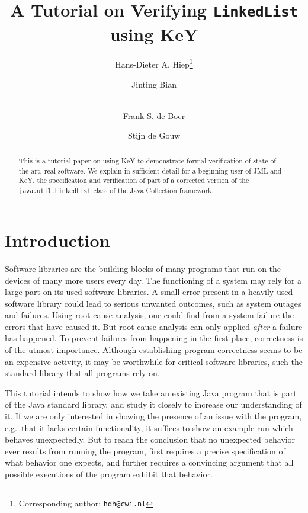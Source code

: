 \documentclass[runningheads]{llncs}
\begin{document}
\renewcommand{\thelstlisting}{\arabic{lstlisting}}

\title{A Tutorial on Verifying \texttt{LinkedList} using KeY}
\author{{Hans-Dieter} A. Hiep\footnote{Corresponding author: \texttt{hdh@cwi.nl}} \and Jinting Bian \and\\
Frank S. de Boer \and Stijn de Gouw}


\maketitle

\begin{abstract}
This is a tutorial paper on using KeY to demonstrate formal verification of state-of-the-art, real software. We explain in sufficient detail for a beginning user of JML and KeY, the specification and verification of part of a corrected version of the \texttt{java.util.LinkedList} class of the Java Collection framework.
\end{abstract}


\section{Introduction}

Software libraries are the building blocks of many programs that run on the devices of many more users every day. The functioning of a system may rely for a large part on its used software libraries. A small error present in a heavily-used software library could lead to serious unwanted outcomes, such as system outages and failures. Using root cause analysis, one could find from a system failure the errors that have caused it. But root cause analysis can only applied \emph{after} a failure has happened. To prevent failures from happening in the first place, correctness is of the utmost importance. Although establishing program correctness seems to be an expensive activity, it may be worthwhile for critical software libraries, such the standard library that all programs rely on.

This tutorial intends to show how we take an existing Java program that is part of the Java standard library, and study it closely to increase our understanding of it. If we are only interested in showing the presence of an issue with the program, e.g.~that it lacks certain functionality, it suffices to show an example run which behaves unexpectedly. But to reach the conclusion that no unexpected behavior ever results from running the program, first requires a precise specification of what behavior one expects, and further requires a convincing argument that all possible executions of the program exhibit that behavior.
\end{document}

